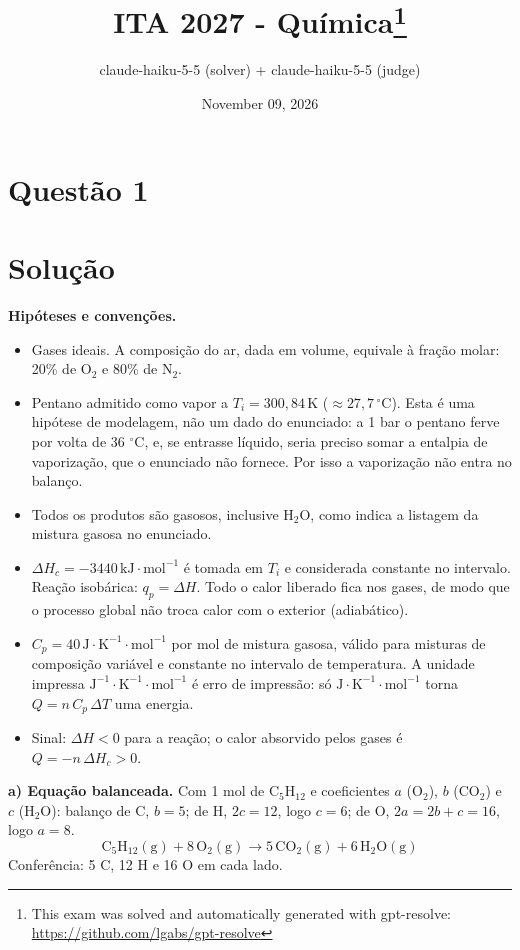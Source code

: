 \documentclass{article}%
\title{ITA 2027 - Química\thanks{This exam was solved and automatically generated with gpt-resolve: \url{https://github.com/lgabs/gpt-resolve}}}%
\author{claude{-}haiku{-}5{-}5 (solver) + claude{-}haiku{-}5{-}5 (judge)}%
\date{November 09, 2026}%
\begin{document}
%
\normalsize%
\maketitle%
\section*{Questão 1}

\section*{Solução}

\textbf{Hipóteses e convenções.}
\begin{itemize}
\item Gases ideais. A composição do ar, dada em volume, equivale à fração molar: 20\% de O$_2$ e 80\% de N$_2$.
\item Pentano admitido como vapor a $T_i=300{,}84\,\text{K}$ ($\approx27{,}7\,^{\circ}\text{C}$). Esta é uma hipótese de modelagem, não um dado do enunciado: a 1 bar o pentano ferve por volta de 36 $^{\circ}$C, e, se entrasse líquido, seria preciso somar a entalpia de vaporização, que o enunciado não fornece. Por isso a vaporização não entra no balanço.
\item Todos os produtos são gasosos, inclusive H$_2$O, como indica a listagem da mistura gasosa no enunciado.
\item $\Delta H_c=-3440\,\text{kJ}\cdot\text{mol}^{-1}$ é tomada em $T_i$ e considerada constante no intervalo. Reação isobárica: $q_p=\Delta H$. Todo o calor liberado fica nos gases, de modo que o processo global não troca calor com o exterior (adiabático).
\item $C_p=40\,\text{J}\cdot\text{K}^{-1}\cdot\text{mol}^{-1}$ por mol de mistura gasosa, válido para misturas de composição variável e constante no intervalo de temperatura. A unidade impressa $\text{J}^{-1}\cdot\text{K}^{-1}\cdot\text{mol}^{-1}$ é erro de impressão: só $\text{J}\cdot\text{K}^{-1}\cdot\text{mol}^{-1}$ torna $Q=n\,C_p\,\Delta T$ uma energia.
\item Sinal: $\Delta H<0$ para a reação; o calor absorvido pelos gases é $Q=-n\,\Delta H_c>0$.
\end{itemize}

\textbf{a) Equação balanceada.} Com 1 mol de C$_5$H$_{12}$ e coeficientes $a$ (O$_2$), $b$ (CO$_2$) e $c$ (H$_2$O): balanço de C, $b=5$; de H, $2c=12$, logo $c=6$; de O, $2a=2b+c=16$, logo $a=8$.
\[
\mathrm{C_5H_{12}(g)}+8\,\mathrm{O_2(g)}\rightarrow 5\,\mathrm{CO_2(g)}+6\,\mathrm{H_2O(g)}
\]
Conferência: 5 C, 12 H e 16 O em cada lado.
\end{document}
